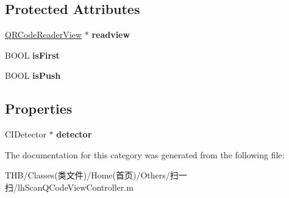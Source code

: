 \subsection*{Protected Attributes}
\begin{DoxyCompactItemize}
\item 
\mbox{\label{categorylh_scan_q_code_view_controller_07_08_a3f5330d6df0c1b8c2c36efeae85e394f}} 
\mbox{\hyperlink{interface_q_r_code_reader_view}{Q\+R\+Code\+Reader\+View}} $\ast$ {\bfseries readview}
\item 
\mbox{\label{categorylh_scan_q_code_view_controller_07_08_aee3bb5a116489004f4c402ce22ae9db6}} 
B\+O\+OL {\bfseries is\+First}
\item 
\mbox{\label{categorylh_scan_q_code_view_controller_07_08_adab5e9d8f4926cea856e28e752357767}} 
B\+O\+OL {\bfseries is\+Push}
\end{DoxyCompactItemize}
\subsection*{Properties}
\begin{DoxyCompactItemize}
\item 
\mbox{\label{categorylh_scan_q_code_view_controller_07_08_a1028369027570148e914ad8aaf15ca0e}} 
C\+I\+Detector $\ast$ {\bfseries detector}
\end{DoxyCompactItemize}


The documentation for this category was generated from the following file\+:\begin{DoxyCompactItemize}
\item 
T\+H\+B/\+Classes(类文件)/\+Home(首页)/\+Others/扫一扫/lh\+Scan\+Q\+Code\+View\+Controller.\+m\end{DoxyCompactItemize}
